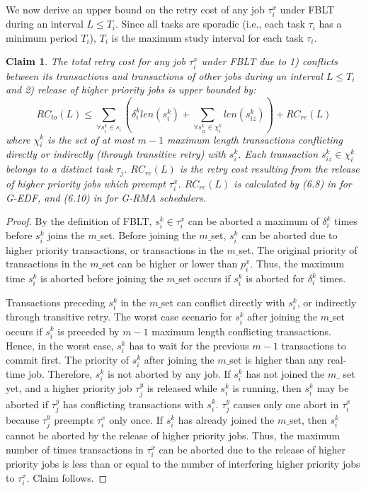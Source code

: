 \documentclass[conference]{IEEEtran}
\newtheorem{clm}{Claim}
\begin{document}
We now derive an upper bound on the retry cost of any job $\tau_{i}^{x}$
under FBLT during an interval $L\le T_{i}$. Since all tasks are sporadic
(i.e., each task $\tau_{i}$ has a minimum period $T_{i}$), $T_{i}$
is the maximum study interval for each task $\tau_{i}$. 
%
\begin{clm}
The total retry cost for any job $\tau_{i}^{x}$ under FBLT due to 1) conflicts
between its transactions and transactions of other jobs during an interval $L\le T_{i}$ and 2) release of higher priority jobs is upper bounded by:
%
\begin{equation}
RC_{to}(L)\le\sum_{\forall s_{i}^{k}\in s_{i}}\left(\delta_{i}^{k}len(s_{i}^{k})+\sum_{\forall s_{iz}^k\in \chi_i^k} len(s_{iz}^{k})\right)+RC_{re}(L)\label{eq:fblt_rc}
\end{equation} 
where $\chi_i^k$ is the set of at most $m-1$ maximum length transactions conflicting directly or indirectly (through transitive retry) with $s_i^k$. Each transaction $s_{iz}^k \in \chi_i^k$ belongs to a distinct task $\tau_j$. $RC_{re}(L)$ is the retry cost resulting
from the release of higher priority jobs which preempt $\tau_{i}^{x}$.
$RC_{re}(L)$ is calculated by (6.8) in \cite{shambake_phd_proposal}
for G-EDF, and (6.10) in \cite{shambake_phd_proposal} for G-RMA schedulers.
%
\end{clm}
%
\begin{proof}
By the definition of FBLT, $s_{i}^{k}\in\tau_{i}^{x}$ can be aborted
a maximum of $\delta_{i}^{k}$ times before $s_{i}^{k}$ joins the $m\_$set. Before joining the $m\_$set, $s_{i}^{k}$ can be aborted due to higher priority transactions, or transactions
in the $m\_$set. The original priority of transactions in the $m\_$set can be higher or lower than
$p_{i}^{x}$. Thus, the maximum time $s_{i}^{k}$ is aborted before
joining the $m\_$set occurs if $s_{i}^{k}$ is aborted for $\delta_{i}^{k}$ times. 

Transactions preceding  $s_i^k$ in the $m\_$set can conflict directly with $s_i^k$, or indirectly through transitive retry. The worst case scenario for $s_{i}^{k}$ after joining the $m\_$set occurs if $s_{i}^{k}$ is preceded by $m-1$ maximum length conflicting transactions. Hence, in the worst case, $s_{i}^{k}$ has to wait for the previous $m-1$ transactions to commit first. The priority of $s_{i}^{k}$ after joining the $m\_$set is higher than any real-time job. Therefore, $s_{i}^{k}$ is not aborted
by any job. If $s_{i}^{k}$ has not joined the $m\_$ set yet, and a higher
priority job $\tau_{j}^{y}$ is released while $s_{i}^{k}$ is running,
then $s_{i}^{k}$ may be aborted if $\tau_{j}^{y}$ has conflicting
transactions with $s_{i}^{k}$. $\tau_{j}^{y}$ causes only one abort
in $\tau_{i}^{x}$ because $\tau_{j}^{y}$ preempts $\tau_{i}^{x}$
only once. If $s_{i}^{k}$ has already joined the $m\_$set, then $s_{i}^{k}$
cannot be aborted by the release of higher priority jobs. Thus, the maximum
number of times transactions in $\tau_{i}^{x}$ can be aborted due to the release
of higher priority jobs is less than or equal to the number of interfering
higher priority jobs to $\tau_{i}^{x}$. Claim follows.
\end{proof}
\end{document}
